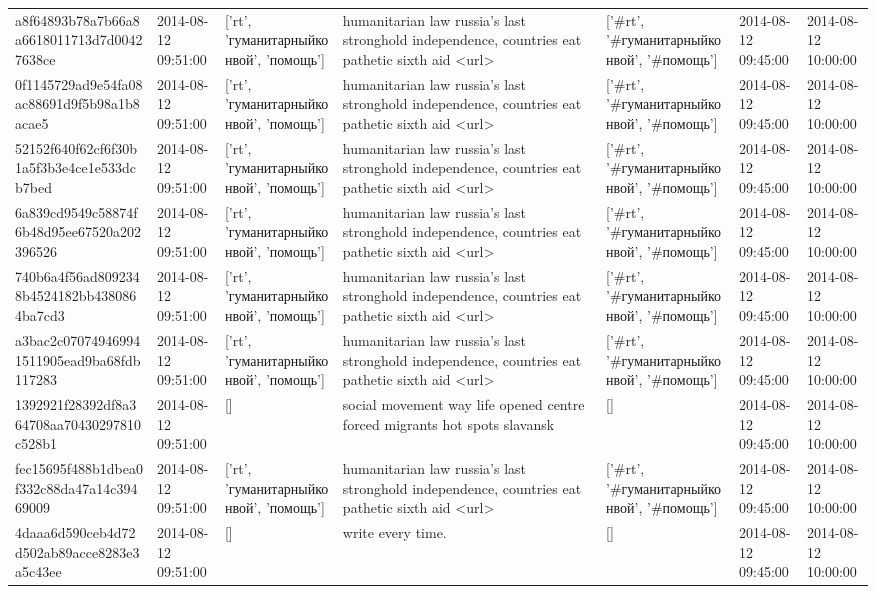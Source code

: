 \begin{tabular}{lllllll}
a8f64893b78a7b66a8a6618011713d7d00427638ce & 2014-08-12 09:51:00 & ['rt', 'гуманитарныйконвой', 'помощь'] & humanitarian law russia's last stronghold independence, countries eat pathetic sixth aid <url> & ['#rt', '#гуманитарныйконвой', '#помощь'] & 2014-08-12 09:45:00 & 2014-08-12 10:00:00 \\
0f1145729ad9e54fa08ac88691d9f5b98a1b8acae5 & 2014-08-12 09:51:00 & ['rt', 'гуманитарныйконвой', 'помощь'] & humanitarian law russia's last stronghold independence, countries eat pathetic sixth aid <url> & ['#rt', '#гуманитарныйконвой', '#помощь'] & 2014-08-12 09:45:00 & 2014-08-12 10:00:00 \\
52152f640f62cf6f30b1a5f3b3e4ce1e533dcb7bed & 2014-08-12 09:51:00 & ['rt', 'гуманитарныйконвой', 'помощь'] & humanitarian law russia's last stronghold independence, countries eat pathetic sixth aid <url> & ['#rt', '#гуманитарныйконвой', '#помощь'] & 2014-08-12 09:45:00 & 2014-08-12 10:00:00 \\
6a839cd9549c58874f6b48d95ee67520a202396526 & 2014-08-12 09:51:00 & ['rt', 'гуманитарныйконвой', 'помощь'] & humanitarian law russia's last stronghold independence, countries eat pathetic sixth aid <url> & ['#rt', '#гуманитарныйконвой', '#помощь'] & 2014-08-12 09:45:00 & 2014-08-12 10:00:00 \\
740b6a4f56ad8092348b4524182bb4380864ba7cd3 & 2014-08-12 09:51:00 & ['rt', 'гуманитарныйконвой', 'помощь'] & humanitarian law russia's last stronghold independence, countries eat pathetic sixth aid <url> & ['#rt', '#гуманитарныйконвой', '#помощь'] & 2014-08-12 09:45:00 & 2014-08-12 10:00:00 \\
a3bac2c070749469941511905ead9ba68fdb117283 & 2014-08-12 09:51:00 & ['rt', 'гуманитарныйконвой', 'помощь'] & humanitarian law russia's last stronghold independence, countries eat pathetic sixth aid <url> & ['#rt', '#гуманитарныйконвой', '#помощь'] & 2014-08-12 09:45:00 & 2014-08-12 10:00:00 \\
1392921f28392df8a364708aa70430297810c528b1 & 2014-08-12 09:51:00 & [] & social movement way life opened centre forced migrants hot spots slavansk & [] & 2014-08-12 09:45:00 & 2014-08-12 10:00:00 \\
fec15695f488b1dbea0f332c88da47a14c39469009 & 2014-08-12 09:51:00 & ['rt', 'гуманитарныйконвой', 'помощь'] & humanitarian law russia's last stronghold independence, countries eat pathetic sixth aid <url> & ['#rt', '#гуманитарныйконвой', '#помощь'] & 2014-08-12 09:45:00 & 2014-08-12 10:00:00 \\
4daaa6d590ceb4d72d502ab89acce8283e3a5c43ee & 2014-08-12 09:51:00 & [] & write every time. & [] & 2014-08-12 09:45:00 & 2014-08-12 10:00:00 \\

\end{tabular}
